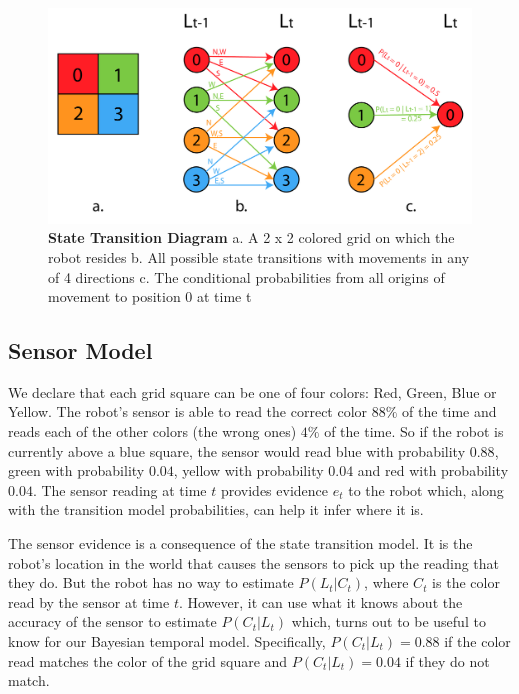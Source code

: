 \documentclass{article}
\begin{document}
\vspace{5mm}

\vspace{5mm}

\begin{figure}[!htb]
\centering
\includegraphics[scale=0.4]{transitions.pdf}
\caption{{\bf State Transition Diagram} a. A 2 x 2 colored grid on which the robot resides \hspace{1mm} b. All possible state transitions with movements in any of 4 directions \hspace{1mm} c. The conditional probabilities from all origins of movement to position 0 at time t }
\end{figure}

\subsection{Sensor Model}

We declare that each grid square can be one of four colors: Red, Green, Blue or Yellow. The robot's sensor is able to read the correct color $88\%$ of the time and reads each of the other colors (the wrong ones) $4\%$ of the time. So if the robot is currently above a blue square, the sensor would read blue with probability $0.88$, green with probability $0.04$, yellow with probability $0.04$ and red with probability $0.04$. The sensor reading at time $t$ provides evidence $e_t$ to the robot which, along with the transition model probabilities, can help it infer where it is.

The sensor evidence is a consequence of the state transition model. It is the robot's location in the world that causes the sensors to pick up the reading that they do. But the robot has no way to estimate $P(L_t | C_t)$, where $C_t$ is the color read by the sensor at time $t$. However, it can use what it knows about the accuracy of the sensor to estimate $P(C_t | L_t)$ which, turns out to be useful to know for our Bayesian temporal model. Specifically, $P(C_t | L_t) = 0.88$ if the color read matches the color of the grid square and $P(C_t | L_t) = 0.04$ if they do not match.
\end{document}
